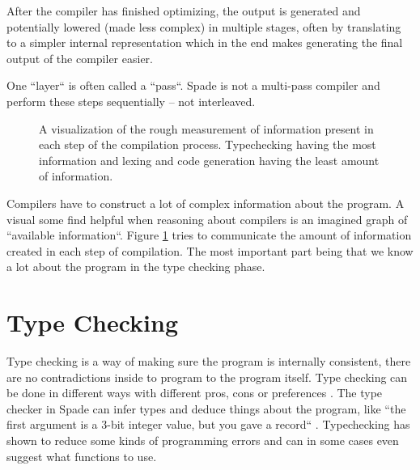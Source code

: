 After the compiler has finished optimizing, the output is generated and potentially lowered (made less complex) in multiple stages, often by translating to a simpler internal representation which in the end makes generating the final output of the compiler easier.

One ``layer`` is often called a ``pass``. Spade is not a multi-pass compiler and perform these steps sequentially -- not interleaved.
\cite{src:DragonBook}\cite{src:CraftingInterp}\cite{src:KKLectures}

\begin{figure}
\begin{center}
  \caption{A visualization of the rough measurement of information present in each step of the compilation process. Typechecking having the most information and lexing and code generation having the least amount of information.}
  \label{fig:InformationCompilation}
\end{center}
\end{figure}

Compilers have to construct a lot of complex information about the program. A visual some find helpful when reasoning about compilers is an imagined graph of ``available information``. Figure \ref{fig:InformationCompilation} tries to communicate the amount of information created in each step of compilation. The most important part being that we know a lot about the program in the type checking phase.


\section{Type Checking} %
\label{sec:TypeChecking}
Type checking is a way of making sure the program is internally consistent, there are no contradictions inside to program to the program itself. Type checking can be done in different ways with different pros, cons or preferences \cite{src:TypeCheckersBook}. The type checker in Spade can infer types and deduce things about the program, like ``the first argument is a 3-bit integer value, but you gave a record`` \cite{src:spadeAnHDL}. Typechecking has shown to reduce some kinds of programming errors and can in some cases even suggest what functions to use.

